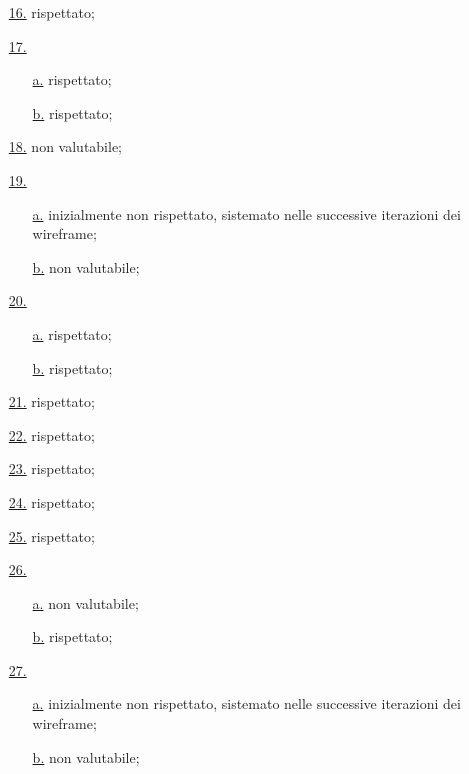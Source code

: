 \begin{itemize}
    \item[{\hyperref[lg:16]{16.}}] rispettato;
    \item[{\hyperref[lg:17]{17.}}] \begin{itemize}
        \item[{\hyperref[lg:17.a]{a.}}] rispettato;
        \item[{\hyperref[lg:17.b]{b.}}] rispettato;
    \end{itemize}
    \item[{\hyperref[lg:18]{18.}}] non valutabile;
    \item[{\hyperref[lg:19]{19.}}] \begin{itemize}
        \item[{\hyperref[lg:19.a]{a.}}] inizialmente non rispettato, sistemato nelle successive iterazioni dei wireframe;
        \item[{\hyperref[lg:19.b]{b.}}] non valutabile;
    \end{itemize}
    \item[{\hyperref[lg:20]{20.}}] \begin{itemize}
        \item[{\hyperref[lg:20.a]{a.}}] rispettato;
        \item[{\hyperref[lg:20.b]{b.}}] rispettato;
    \end{itemize}
    \item[{\hyperref[lg:21]{21.}}] rispettato;
    \item[{\hyperref[lg:22]{22.}}] rispettato;
    \item[{\hyperref[lg:23]{23.}}] rispettato;
    \item[{\hyperref[lg:24]{24.}}] rispettato;
    \item[{\hyperref[lg:25]{25.}}] rispettato;
    \item[{\hyperref[lg:26]{26.}}] \begin{itemize}
        \item[{\hyperref[lg:26.a]{a.}}] non valutabile;
        \item[{\hyperref[lg:26.b]{b.}}] rispettato;
    \end{itemize}
    \item[{\hyperref[lg:27]{27.}}] \begin{itemize}
        \item[{\hyperref[lg:27.a]{a.}}] inizialmente non rispettato, sistemato nelle successive iterazioni dei wireframe;
        \item[{\hyperref[lg:27.b]{b.}}] non valutabile;
    \end{itemize}

\end{itemize}
